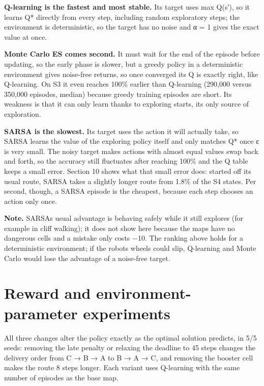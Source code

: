 \documentclass[12pt,a4paper]{article}
\begin{document}
\textbf{Q-learning is the fastest and most stable.} Its target uses max
Q(s′), so it learns Q* directly from every step, including random
exploratory steps; the environment is deterministic, so the target has
no noise and α = 1 gives the exact value at once.

\textbf{Monte Carlo ES comes second.} It must wait for the end of the
episode before updating, so the early phase is slower, but a greedy
policy in a deterministic environment gives noise-free returns, so once
converged its Q is exactly right, like Q-learning. On S3 it even reaches
100\% earlier than Q-learning (290,000 versus 350,000 episodes, median)
because greedy training episodes are short. Its weakness is that it can
only learn thanks to exploring starts, its only source of exploration.

\textbf{SARSA is the slowest.} Its target uses the action it will
actually take, so SARSA learns the value of the exploring policy itself
and only matches Q* once ε is very small. The noisy target makes actions
with almost equal values swap back and forth, so the accuracy still
fluctuates after reaching 100\% and the Q table keeps a small error.
Section 10 shows what that small error does: started off its usual
route, SARSA takes a slightly longer route from 1.8\% of the S4 states.
Per second, though, a SARSA episode is the cheapest, because each step
chooses an action only once.

\textbf{Note.} SARSA\textquotesingle s usual advantage is behaving
safely while it still explores (for example in cliff walking); it does
not show here because the maps have no dangerous cells and a mistake
only costs −10. The ranking above holds for a deterministic environment;
if the robot\textquotesingle s wheels could slip, Q-learning and Monte
Carlo would lose the advantage of a noise-free target.

\hypertarget{reward-and-environment-parameter-experiments}{%
\section{Reward and environment-parameter
experiments}\label{reward-and-environment-parameter-experiments}}

All three changes alter the policy exactly as the optimal solution
predicts, in 5/5 seeds: removing the late penalty or relaxing the
deadline to 45 steps changes the delivery order from C → B → A to B → A
→ C, and removing the booster cell makes the route 8 steps longer. Each
variant uses Q-learning with the same number of episodes as the base
map.
\end{document}
